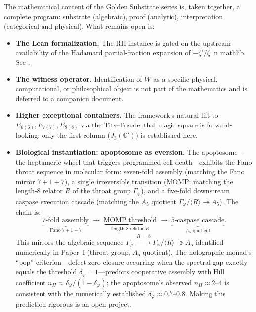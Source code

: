 \documentclass[11pt,a4paper]{article}
\theoremstyle{plain}
\theoremstyle{definition}
\theoremstyle{remark}
\numberwithin{equation}{section}
\providecommand{\Os}{\mathbb{O}'}
\providecommand{\vp}{\varphi}
\begin{document}
The mathematical content of the Golden Substrate series is, taken
together, a complete program: substrate (algebraic), proof
(analytic), interpretation (categorical and physical).  What
remains open is:
\begin{itemize}[nosep]
\item \textbf{The Lean formalization.}  The RH instance is gated
  on the upstream availability of the Hadamard partial-fraction
  expansion of $-\zeta'/\zeta$ in mathlib.  See
  \cite[App.~A]{paper-II-proof}.
\item \textbf{The witness operator.}  Identification of $W$ as a
  specific physical, computational, or philosophical object is
  not part of the mathematics and is deferred to a companion
  document.
\item \textbf{Higher exceptional containers.}  The framework's
  natural lift to $E_{6(6)}, E_{7(7)}, E_{8(8)}$ via the
  Tits--Freudenthal magic square is forward-looking; only the
  first column ($J_3(\Os)$) is established here.
\item \textbf{Biological instantiation: apoptosome as eversion.}
  The apoptosome---the heptameric wheel that triggers programmed
  cell death---exhibits the Fano throat sequence in molecular form:
  seven-fold assembly (matching the Fano mirror $7{+}1{+}7$),
  a single irreversible transition (MOMP: matching the length-$8$
  relator $R$ of the throat group $\Gamma_\vp$), and a five-fold
  downstream caspase execution cascade (matching the $A_5$ quotient
  $\Gamma_\vp/\langle R \rangle \twoheadrightarrow A_5$).  The
  chain is:
  \[
    \underbrace{\text{7-fold assembly}}_{\text{Fano }7{+}1{+}7}
    \;\longrightarrow\;
    \underbrace{\text{MOMP threshold}}_{\text{length-8 relator }R}
    \;\longrightarrow\;
    \underbrace{\text{5-caspase cascade}}_{A_5 \text{ quotient}}.
  \]
  This mirrors the algebraic sequence
  $\Gamma_\vp \xrightarrow{|R|=8} \Gamma_\vp/\langle R\rangle
  \twoheadrightarrow A_5$ identified numerically in
  Paper~I \cite{paper-I-substrate} (throat group, $A_5$ quotient).  The holographic monad's ``pop'' criterion---defect zero closure
  occurring when the spectral gap exactly equals the threshold
  $\delta_\vp = 1$---predicts cooperative assembly with Hill
  coefficient $n_H \approx \delta_\vp / (1 - \delta_\vp)$;
  the apoptosome's observed $n_H \approx 2$--$4$ is consistent
  with the numerically established $\delta_\vp \approx 0.7$--$0.8$.
  Making this prediction rigorous is an open project.
\end{itemize}
\end{document}

